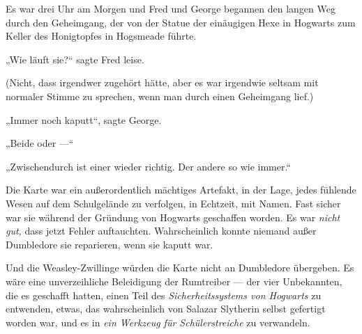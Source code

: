 Es war drei Uhr am Morgen und Fred und George begannen den langen Weg durch den Geheimgang, der von der Statue der einäugigen Hexe in Hogwarts zum Keller des Honigtopfes in Hogsmeade führte.

„Wie läuft sie?“ sagte Fred leise.

(Nicht, dass irgendwer zugehört hätte, aber es war irgendwie seltsam mit normaler Stimme zu sprechen, wenn man durch einen Geheimgang lief.)

„Immer noch kaputt“, sagte George.

„Beide oder —“

„Zwischendurch ist einer wieder richtig. Der andere so wie immer.“

Die Karte war ein außerordentlich mächtiges Artefakt, in der Lage, jedes fühlende Wesen auf dem Schulgelände zu verfolgen, in Echtzeit, mit Namen. Fast sicher war sie während der Gründung von Hogwarts geschaffen worden. Es war \emph{nicht gut,} dass jetzt Fehler auftauchten. Wahrscheinlich konnte niemand außer Dumbledore sie reparieren, wenn sie kaputt war.

Und die Weasley-Zwillinge würden die Karte nicht an Dumbledore übergeben. Es wäre eine unverzeihliche Beleidigung der Rumtreiber — der vier Unbekannten, die es geschafft hatten, einen Teil des \emph{Sicherheitssystems von Hogwarts} zu entwenden, etwas, das wahrscheinlich von Salazar Slytherin selbst gefertigt worden war, und es in \emph{ein Werkzeug für Schülerstreiche} zu verwandeln.

